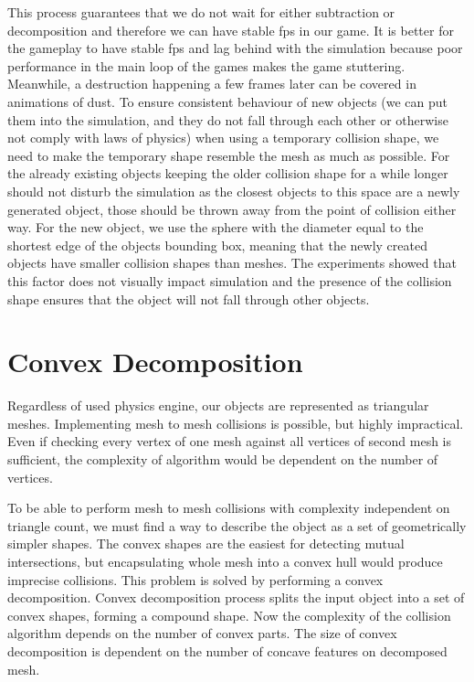 This process guarantees that we do not wait for either subtraction or decomposition and therefore we can have stable fps in our game.  It is better for the gameplay to have stable fps and lag behind with the simulation because poor performance in the main loop of the games makes the game stuttering. Meanwhile, a destruction happening a few frames later can be covered in animations of dust. To ensure consistent behaviour of new objects (we can put them into the simulation, and they do not fall through each other or otherwise not comply with laws of physics) when using a temporary collision shape, we need to make the temporary shape resemble the mesh as much as possible.  For the already existing objects keeping the older collision shape for a while longer should not disturb the simulation as the closest objects to this space are a newly generated object, those should be thrown away from the point of collision either way. For the new object, we use the sphere with the diameter equal to the shortest edge of the objects bounding box, meaning that the newly created objects have smaller collision shapes than meshes. The experiments showed that this factor does not visually impact simulation and the presence of the collision shape ensures that the object will not fall through other objects. 


\section{Convex Decomposition}
\label{sec:decomposition}
Regardless of used physics engine, our objects are represented as triangular meshes. Implementing mesh to mesh collisions is possible, but highly impractical. Even if checking every vertex of one mesh against all vertices of second mesh is sufficient, the complexity of algorithm would be dependent on the number of vertices.

To be able to perform mesh to mesh collisions with complexity independent on triangle count, we must find a way to describe the object as a set of geometrically simpler shapes. The convex shapes are the easiest for detecting mutual intersections, but encapsulating whole mesh into a convex hull would produce imprecise collisions. This problem is solved by performing a convex decomposition. Convex decomposition process splits the input object into a set of convex shapes, forming a compound shape. Now the complexity of the collision algorithm depends on the number of convex parts. The size of convex decomposition is dependent on the number of concave features on decomposed mesh.

